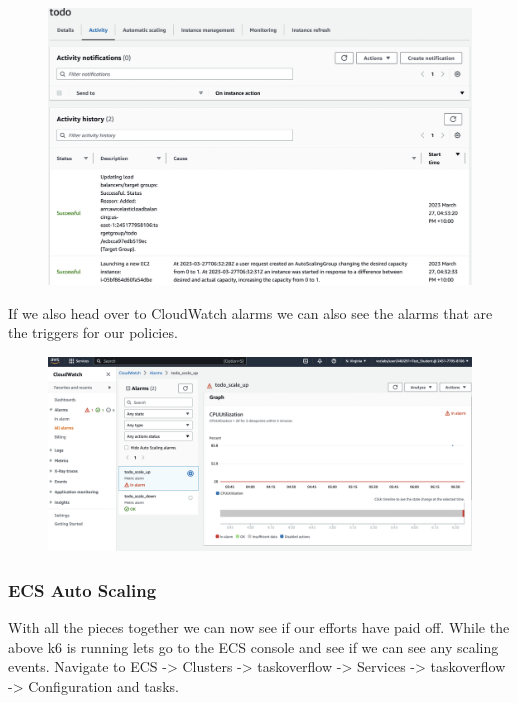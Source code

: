 \documentclass{csse4400}
\begin{document}
\begin{figure}[H]
  \begin{center}
    \includegraphics[width=\textwidth]{images/ec2_6}
  \end{center}
\end{figure}

If we also head over to CloudWatch alarms we can also see the alarms that are the triggers for our policies.

\begin{figure}[H]
  \begin{center}
    \includegraphics[width=\textwidth]{images/ec2_7}
  \end{center}
\end{figure}

\subsubsection{ECS Auto Scaling}

With all the pieces together we can now see if our efforts have paid off. While the above k6 is running lets go to the ECS console and see if we can see any scaling events. Navigate to ECS -> Clusters -> taskoverflow -> Services -> taskoverflow -> Configuration and tasks.
\end{document}
